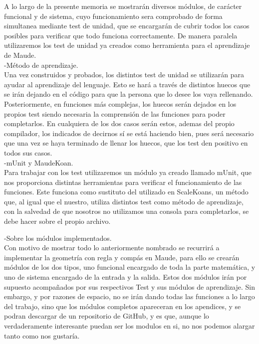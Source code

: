 A lo largo de la presente memoria se mostrarán diversos módulos, de carácter funcional y de sistema, cuyo funcionamiento sera comprobado de forma simultanea mediante test de unidad, que se encargarán de cubrir todos los casos posibles para verificar que todo funciona correctamente. De manera paralela utilizaremos los test de unidad ya creados como herramienta para el aprendizaje de Maude. \\

-Método de aprendizaje. \\

Una vez construidos y probados, los distintos test de unidad se utilizarán para ayudar al aprendizaje del lenguaje. Esto se hará a través de distintos huecos que se irán dejando en el código para que la persona que lo desee los vaya rellenando. Posteriormente, en funciones más complejas, los huecos serán dejados en los propios test siendo necesaria la comprensión de las funciones para poder completarlos. En cualquiera de los dos casos serán estos, ademas del propio compilador, los indicados de decirnos sí se está haciendo bien, pues será necesario que una vez se haya terminado de llenar los huecos, que los test den positivo en todos sus casos.\\

-mUnit y MaudeKoan. \\

Para trabajar con los test utilizaremos un módulo ya creado llamado mUnit, que nos proporciona distintas herramientas para verificar el funcionamiento de las funciones. Este funciona como sustituto del utilizado en ScaleKoans, un método que, al igual que el nuestro, utiliza distintos test como método de aprendizaje, con la salvedad de que nosotros no utilizamos una consola para completarlos, se debe hacer sobre el propio archivo.

-Sobre los módulos implementados.\\

Con motivo de mostrar todo lo anteriormente nombrado se recurrirá a implementar la geometría con regla y compás en Maude, para ello se crearán módulos de los dos tipos, uno funcional encargado de toda la parte matemática, y uno de sistema encargado de la entrada y la salida. Estos dos módulos irán por supuesto acompañados por sus respectivos Test y sus módulos de aprendizaje. Sin embargo, y por razones de espacio, no se irán dando todas las funciones a lo largo del trabajo, sino que los módulos completos apareceran en los apendices, y se podran descargar de un repositorio de GitHub, y es que, aunque lo verdaderamente interesante puedan ser los modulos en si, no nos podemos alargar tanto como nos gustaría.\\

